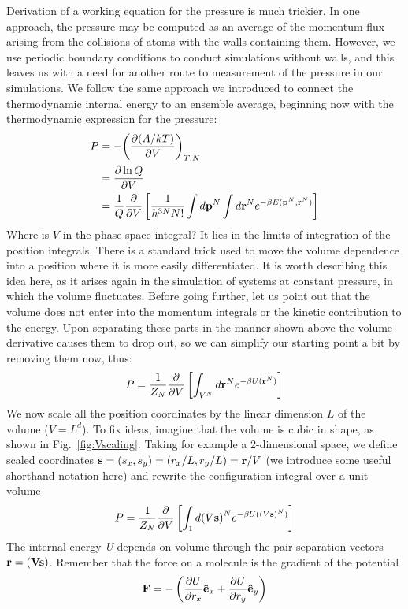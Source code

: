 \documentclass[9pt,bestpractices]{molsim}
\begin{document}
Derivation of a working equation for the pressure is much trickier.
In one approach, the pressure may be computed as an average of the momentum
flux arising from the collisions of atoms with the walls
containing them. However, we use periodic boundary
conditions to conduct simulations without walls, and this leaves us with
a need for another route to measurement of the pressure in our
simulations. We follow the same approach we introduced to connect the
thermodynamic internal energy to an ensemble average, beginning now with
the thermodynamic expression for the pressure:
\begin{align*}
P &=  - {\left( {\frac{{\partial (A/kT)}}{{\partial V}}} \right)_{T,N}}\\
 &= \frac{{\partial \ln Q}}{{\partial V}}\\
 &= \frac{1}{Q}\frac{\partial }{{\partial V}}\left[ {\frac{1}{{{h^{3N}}N!}}\int {d{{\bf{p}}^N}\int {d{{\bf{r}}^N}} {e^{ - \beta E({{\bf{p}}^N},{{\bf{r}}^N})}}} } \right]
\end{align*}
Where is $V$ in the phase-space integral? It lies in the limits of
integration of the position integrals. There is a standard trick used to
move the volume dependence into a position where it is more easily
differentiated. It is worth describing this idea here, as it arises
again in the simulation of systems at constant pressure, in which the
volume fluctuates. Before going further, let us point out that the
volume does not enter into the momentum integrals or the kinetic
contribution to the energy. Upon separating these parts in the manner
shown above the volume derivative causes them to drop out, so we can
simplify our starting point a bit by removing them now, thus:
\[P = \frac{1}{{{Z_N}}}\frac{\partial }{{\partial V}}\left[ {\int_{{V^N}} {d{{\bf{r}}^N}{e^{ - \beta U({{\bf{r}}^N})}}} } \right]\]
We now scale all the position coordinates by the linear dimension
$L$ of the volume ($V = L^d$). To fix ideas,
imagine that the volume is cubic in shape, as shown in Fig.~\ref{fig:Vscaling}.
Taking for example a 2-dimensional space, we define scaled coordinates ${\bf{s}} = ({s_x},{s_y}) = ({r_x}/L,{r_y}/L) = {\bf{r}}/V$
(we introduce some useful shorthand notation here) and rewrite the
configuration integral over a unit volume
\[P = \frac{1}{{{Z_N}}}\frac{\partial }{{\partial V}}\left[ {\int_1 {d{{(V{\bf{s}})}^N}{e^{ - \beta U({{(V{\bf{s}})}^N})}}} } \right]\]
The internal energy \emph{U} depends on volume through the pair
separation vectors $\bf{r} = (V\bf{s})$. Remember that the force
on a molecule is the gradient of the potential
\[{\bf{F}} =  - \left( {\frac{{\partial U}}{{\partial {r_x}}}{{{\bf{\hat e}}}_x} + \frac{{\partial U}}{{\partial {r_y}}}{{{\bf{\hat e}}}_y}} \right)\]
\end{document}
